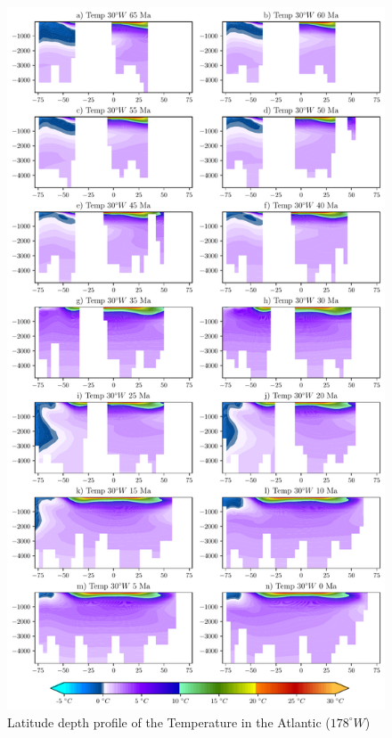 \documentclass[a4paper]{article}
\begin{document}
\begin{figure}[ht]
	\centering
	\includegraphics[width=0.7\linewidth]{full_atlantic_sst.pdf}
	\caption{Latitude depth profile of the Temperature in the Atlantic ($178^{\circ} W$)}
	\label{fig:sst_total_D}
\end{figure}
\end{document}

